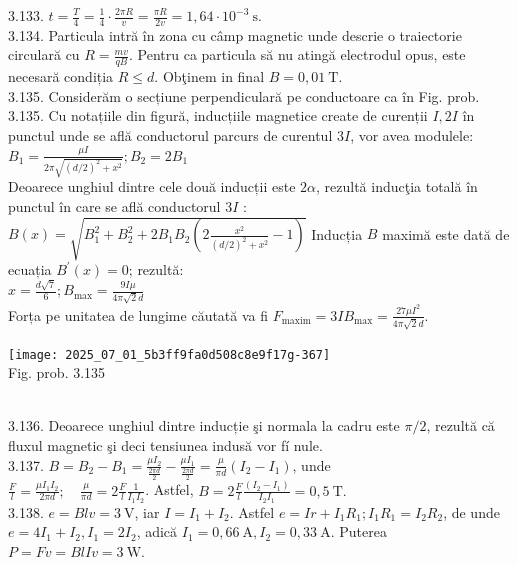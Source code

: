 3.133. $t=\frac{T}{4}=\frac{1}{4} \cdot \frac{2 \pi R}{v}=\frac{\pi R}{2 v}=1,64 \cdot 10^{-3} \mathrm{~s}$.\\

3.134. Particula intră în zona cu câmp magnetic unde descrie o traiectorie circulară cu $R=\frac{m v}{q B}$. Pentru ca particula să nu atingă electrodul opus, este necesară condiția $R \leq d$. Obţinem in final $B=0,01 \mathrm{~T}$.\\

3.135. Considerăm o secțiune perpendiculară pe conductoare ca în Fig. prob. 3.135. Cu notațiile din figură, inducțiile magnetice create de curenții $I, 2 I$ în punctul unde se află conductorul parcurs de curentul $3 I$, vor avea modulele:\\ $B_{1}=\frac{\mu I}{2 \pi \sqrt{(d / 2)^{2}+x^{2}}} ; B_{2}=2 B_{1}$\\ Deoarece unghiul dintre cele două inducții este $2 \alpha$, rezultă inducţia totală în punctul în care se află conductorul $3 I$ :\\ $B(x)=\sqrt{B_{1}^{2}+B_{2}^{2}+2 B_{1} B_{2}\left(2 \frac{x^{2}}{(d / 2)^{2}+x^{2}}-1\right)}$ Inducția $B$ maximă este dată de ecuația $B^{\prime}(x)=0$; rezultă:\\ $x=\frac{d \sqrt{7}}{6} ; B_{\max }=\frac{9 I \mu}{4 \pi \sqrt{2} d}$\\ Forța pe unitatea de lungime căutată va fi $F_{\operatorname{maxim}}=3 I B_{\max }=\frac{27 \mu I^{2}}{4 \pi \sqrt{2} d}$.\\ \begin{center} \texttt{[image: 2025\_07\_01\_5b3ff9fa0d508c8e9f17g-367]}\\ Fig. prob. 3.135 \end{center}\\

3.136. Deoarece unghiul dintre inducție şi normala la cadru este $\pi / 2$, rezultă că fluxul magnetic şi deci tensiunea indusă vor fí nule.\\

3.137. $B=B_{2}-B_{1}=\frac{\mu I_{2}}{\frac{2 \pi d}{2}}-\frac{\mu I_{1}}{\frac{2 \pi d}{2}}=\frac{\mu}{\pi d}\left(I_{2}-I_{1}\right)$, unde\\ $\frac{F}{l}=\frac{\mu I_{1} I_{2}}{2 \pi d} ; \quad \frac{\mu}{\pi d}=2 \frac{F}{l} \frac{1}{I_{1} I_{2}}$. Astfel, $B=2 \frac{F}{l} \frac{\left(I_{2}-I_{1}\right)}{I_{2} I_{1}}=0,5 \mathrm{~T} .$\\

3.138. $e=B l v=3 \mathrm{~V}$, iar $I=I_{1}+I_{2}$. Astfel $e=I r+I_{1} R_{1} ; I_{1} R_{1}=I_{2} R_{2}$, de unde $e=4 I_{1}+I_{2}, I_{1}=2 I_{2}$, adică $I_{1}=0,66 \mathrm{~A}, I_{2}=0,33 \mathrm{~A}$. Puterea $P=F v=B l I v=3 \mathrm{~W}$.\\

